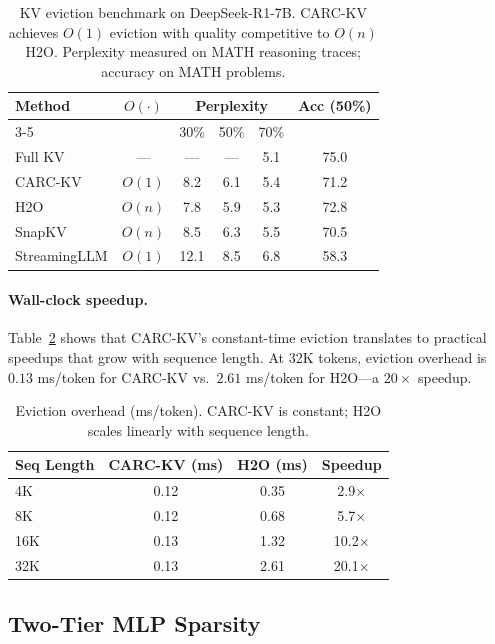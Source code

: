 \documentclass[11pt,a4paper]{article}
\begin{document}
\begin{table}[t]
\centering
\small
\begin{tabular}{lccccc}
\toprule
\textbf{Method} & \textbf{$O(\cdot)$} & \multicolumn{3}{c}{\textbf{Perplexity}} & \textbf{Acc (50\%)} \\
\cmidrule(lr){3-5}
& & 30\% & 50\% & 70\% & \\
\midrule
Full KV     & --- & --- & --- & 5.1 & 75.0 \\
CARC-KV     & $O(1)$ & 8.2 & 6.1 & 5.4 & 71.2 \\
H2O         & $O(n)$ & 7.8 & 5.9 & 5.3 & 72.8 \\
SnapKV      & $O(n)$ & 8.5 & 6.3 & 5.5 & 70.5 \\
StreamingLLM & $O(1)$ & 12.1 & 8.5 & 6.8 & 58.3 \\
\bottomrule
\end{tabular}
\caption{KV eviction benchmark on DeepSeek-R1-7B. CARC-KV achieves $O(1)$ eviction with quality competitive to $O(n)$ H2O. Perplexity measured on MATH reasoning traces; accuracy on MATH problems.}
\label{tab:kv-bench}
\end{table}

\paragraph{Wall-clock speedup.}
Table~\ref{tab:wallclock} shows that CARC-KV's constant-time eviction translates to practical speedups that grow with sequence length.
At 32K tokens, eviction overhead is $0.13$ ms/token for CARC-KV vs.\ $2.61$ ms/token for H2O---a $20\times$ speedup.

\begin{table}[t]
\centering
\small
\begin{tabular}{lccc}
\toprule
\textbf{Seq Length} & \textbf{CARC-KV (ms)} & \textbf{H2O (ms)} & \textbf{Speedup} \\
\midrule
4K  & 0.12 & 0.35 & 2.9$\times$ \\
8K  & 0.12 & 0.68 & 5.7$\times$ \\
16K & 0.13 & 1.32 & 10.2$\times$ \\
32K & 0.13 & 2.61 & 20.1$\times$ \\
\bottomrule
\end{tabular}
\caption{Eviction overhead (ms/token). CARC-KV is constant; H2O scales linearly with sequence length.}
\label{tab:wallclock}
\end{table}

\subsection{Two-Tier MLP Sparsity}
\label{sec:two-tier}
\end{document}
